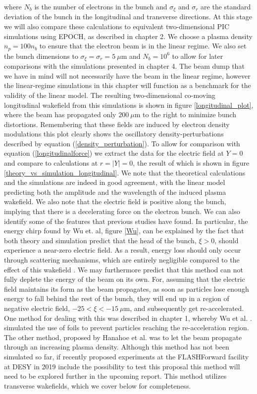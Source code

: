 \noindent where $N_b$ is the number of electrons in the bunch and $\sigma_{\xi}$ and $\sigma_r$ are the standard deviation of the bunch in the longitudinal and transverse directions. At this stage we will also compare these calculations to equivalent two-dimensional PIC simulations using EPOCH, as described in chapter 2.  We choose a plasma density $n_p=100n_b$ to ensure that the electron beam is in the linear regime. We also set the bunch dimensions to $\sigma_{\xi}=\sigma_r=5~\mu\text{m}$ and $N_b=10^6$ to allow for later comparisons with the simulations presented in chapter 4. The beam dump that we have in mind will not necessarily have the beam in the linear regime, however the linear-regime simulations in this chapter will function as a benchmark for the validity of the linear model. The resulting two-dimensional co-moving longitudinal wakefield from this simulations is shown in figure \ref{longitudinal_plot}, where the beam has propagated only $200~\mu\text{m}$ to the right to minimize bunch distortions. Remembering that these fields are induced by electron density modulations this plot clearly shows the oscillatory density-perturbations described by equation (\ref{density_perturbation}). To allow for comparison with equation (\ref{longitudinalforce}) we extract the data for the electric field at $Y=0$ and compare to calculations at $r=|Y|=0$, the result of which is shown in figure \ref{theory_vs_simulation_longitudinal}. We note that the theoretical calculations and the simulations are indeed in good agreement, with the linear model predicting both the amplitude and the wavelength of the induced plasma wakefield. We also note that the electric field is positive along the bunch, implying that there is a decelerating force on the electron bunch. We can also identify some of the features that previous studies have found. In particular, the energy chirp found by Wu et. al, figure \ref{Wu}, can be explained by the fact that both theory and simulation predict that the head of the bunch, $\xi>0$, should experience a near-zero electric field. As a result, energy loss should only occur through scattering mechanisms, which are entirely negligible compared to the effect of this wakefield \cite{Wu2010}. We may furthermore predict that this method can not fully deplete the energy of the beam on its own. For, assuming that the electric field maintains its form as the beam propagates, as soon as particles lose enough energy to fall behind the rest of the bunch, they will end up in a region of negative electric field, $-25<\xi<-15 ~\mu\text{m}$, and subsequently get re-accelerated. One method for dealing with this was described in chapter 1, whereby Wu et al. \cite{Wu2010}. simulated the use of foils to prevent particles reaching the re-acceleration region. The other method, proposed by Hanahoe et al. \cite{Hanahoe2017} was to let the beam propagate through an increasing plasma density. Although this method has not been simulated so far, if recently proposed experiments at the FLASHForward facility at DESY in 2019 include the possibility to test this proposal this method will need to be explored further in the upcoming report. This method utilizes transverse wakefields, which we cover below for completeness. 


